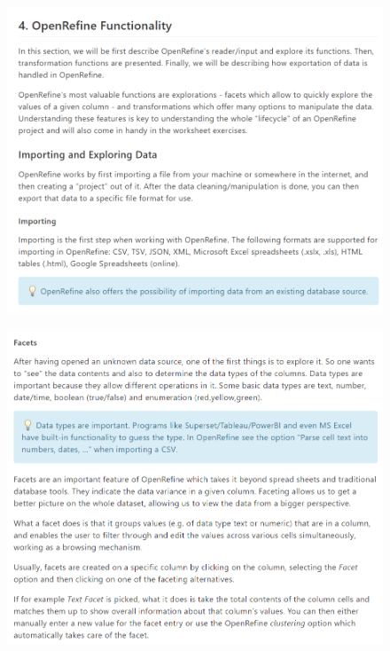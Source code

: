\begin{figure}[H]
    \includegraphics[width=\linewidth]{./Figures/Appendices/worksheet/10.png}
\end{figure}
\begin{figure}[H]
    \includegraphics[width=\linewidth]{./Figures/Appendices/worksheet/11.png}
\end{figure}
